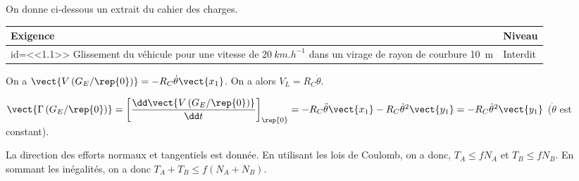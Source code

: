 \begin{multicols}{2}
\else
On donne ci-dessous un extrait du cahier des charges.

\begin{center}
\begin{tabular}{|p{.7\linewidth}|p{.2\linewidth}|}
\hline 
Exigence & Niveau \\
\hline
id=<<1.1>> Glissement du véhicule pour une vitesse de $\SI{20}{km.h^{-1}}$ dans un virage de rayon de courbure \SI{10}{m} 
& Interdit \\
\hline
\end{tabular}
\end{center}

\fi


\ifprof
\begin{corrige}
On a $\vect{V\left(G_E /\rep{0}\right)}=-R_C\dot{\theta}\vect{x_1}$. On a alors $V_L=R_C\dot{\theta}$. 
\end{corrige}
\else
\fi

\ifnormal
{}
\else
\fi


\ifprof
\begin{corrige}
$\vect{\Gamma \left(G_E /\rep{0}\right)}=\left[\dfrac{\dd \vect{V\left(G_E /\rep{0}\right)}}{\dd t}\right]_{\rep{0}}= 
-R_C\ddot{\theta}\vect{x_1}-R_C\dot{\theta}^2\vect{y_1}=-R_C\dot{\theta}^2\vect{y_1}$ ($\dot{\theta}$ est constant).
\end{corrige}
\else
\fi

\ifnormal
{}
\else
\fi

\ifprof
\begin{corrige}
La direction des efforts normaux et tangentiels est donnée. En utilisant les lois de Coulomb, on a donc, $T_A\leq fN_A$ et $T_B\leq fN_B$. En sommant les inégalités, on a donc $T_A+T_B\leq f\left(N_A+N_B\right)$.
\end{corrige}
\else
\fi


\end{multicols}
